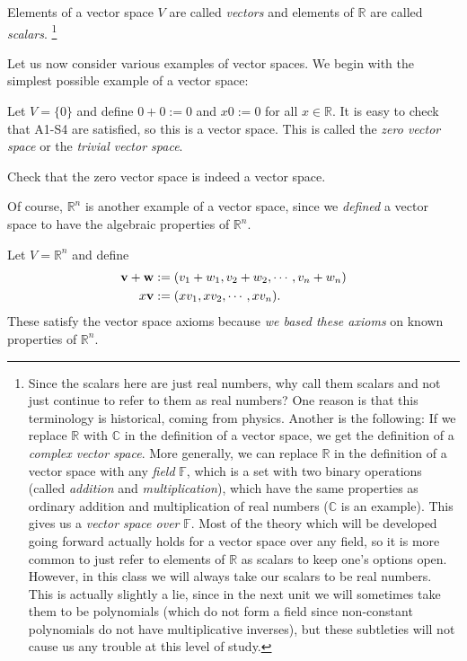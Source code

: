 \documentclass[12pt,letterpaper,reqno]{article}
\numberwithin{equation}{section}
\begin{document}
Elements of a vector space $V$ are called \emph{vectors} and elements of $\mathbb{R}$ are called \emph{scalars}. \footnote{Since the scalars here are just real numbers, why call them scalars and not just continue to refer to them as real numbers? One reason is that this terminology is historical, coming from physics. Another is the following: If we replace $\mathbb{R}$ with $\mathbb{C}$ in the definition of a vector space, we get the definition of a \emph{complex vector space}. More generally, we can replace $\mathbb{R}$ in the definition of a vector space with any  \emph{field} $\mathbb{F}$, which is a set with two binary operations (called \emph{addition} and \emph{multiplication}), which have the same properties as ordinary addition and multiplication of real numbers ($\mathbb{C}$ is an example). This gives us a \emph{vector space over} $\mathbb{F}$. Most of the theory which will be developed going forward actually holds for a vector space over any field, so it is more common to just refer to elements of $\mathbb{R}$ as scalars to keep one's options open. However, in this class we will always take our scalars to be real numbers. This is actually slightly a lie, since in the next unit we will sometimes take them to be polynomials (which do not form a field since non-constant polynomials do not have multiplicative inverses), but these subtleties will not cause us any trouble at this level of study.}

Let us now consider various examples of vector spaces. We begin with the simplest possible example of a vector space:

\begin{example}\label{ex:zero_vector_space}
	Let $V=\{0\}$ and define $0+0:=0$ and $x0:=0$ for all $x \in \mathbb{R}$. It is easy to check that A1-S4 are satisfied, so this is a vector space. This is called the \emph{zero vector space} or the \emph{trivial vector space}.
\end{example}

\begin{exercise}
Check that the zero vector space is indeed a vector space.
\end{exercise}


Of course, $\mathbb{R}^n$ is another example of a vector space, since we \emph{defined} a vector space to have the algebraic properties of $\mathbb{R}^n$. 

\begin{example}[$\mathbb{R}^n$]\label{ex:r_n}
	Let $V=\mathbb{R}^n$ and define
\begin{align*}
	{\bf v}+{\bf w} &:=(v_1+w_1,v_2+w_2,\cdots, v_n+w_n) \\
	x{\bf v} &:=(xv_1, xv_2, \cdots, xv_n).
\end{align*} These satisfy the vector space axioms because \emph{we based these axioms} on known properties of $\mathbb{R}^n$.
\end{example}
\end{document}
